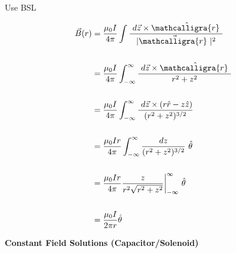 \documentclass[12pt]{article}
\newcommand{\scripty}[1]{\ensuremath{\mathcalligra{#1}}}
\newcommand{\cursrr}{\scripty{r}\ }
\begin{document}
\begin{minipage}[t]{0.45\textwidth}
	Use BSL

	\begin{align*}
		\vec{B}(r) &= \frac{\mu_0 I}{4 \pi}
			\int \frac{ \ d\vec{z} \times \hat{\cursrr} }{|\vec{ \cursrr } |^2} \\ \\
		&= \frac{\mu_0 I}{4 \pi} 
			\int_{-\infty}^{\infty} \frac{ \ d\vec{z} \times \hat{\cursrr} }{r^2 + z^2} \\ \\
		&= \frac{\mu_0 I}{4 \pi} 
			\int_{-\infty}^{\infty} \frac{ \ d\vec{z} \times (r\hat{r} - z\hat{z}) }{ (r^2 + z^2)^{3/2} } \\ \\
		&= \frac{\mu_0 I r}{4 \pi} 
			\int_{-\infty}^{\infty} \frac{dz}{ (r^2 + z^2)^{3/2} } \ \hat{\theta} \\ \\
		&= \frac{\mu_0 I r}{4 \pi} 
			\frac{z}{ r^2 \sqrt{r^2 + z^2} } \bigg|_{-\infty}^{\infty} \ \hat{\theta} \\ \\
		&= \frac{\mu_0 I }{2 \pi r} \hat{\theta}
	\end{align*}
\end{minipage}

%
%
%
\newpage \noindent 

\textbf{Constant Field Solutions (Capacitor/Solenoid)}
\end{document}
